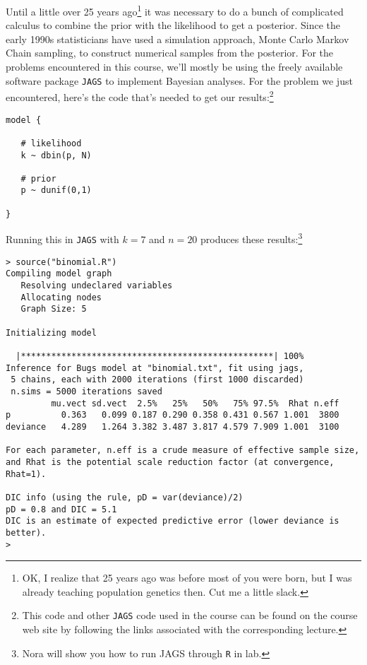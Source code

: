 \documentclass[12pt]{article}
\begin{document}
Until a little over 25 years ago\footnote{OK, I realize that 25 years
  ago was before most of you were born, but I was already teaching
  population genetics then. Cut me a little slack.} it was necessary
to do a bunch of complicated calculus to combine the prior with the
likelihood to get a posterior. Since the early 1990s statisticians
have used a simulation approach, Monte Carlo Markov Chain sampling, to
construct numerical samples from the posterior. For the problems
encountered in this course, we'll mostly be using the freely available
software package {\tt JAGS} to implement Bayesian analyses. For the
problem we just encountered, here's the code that's needed to get our
results:\footnote{This code and other {\tt JAGS} code used in the
  course can be found on the course web site by following the links
  associated with the corresponding
  lecture.}
\begin{verbatim}
model {

   # likelihood
   k ~ dbin(p, N)

   # prior
   p ~ dunif(0,1)

}
\end{verbatim}
Running this in {\tt JAGS} with $k=7$ and $n=20$ produces these
results:\footnote{Nora will show you how to run JAGS through {\tt R}
  in lab.}
\begin{verbatim}
> source("binomial.R")
Compiling model graph
   Resolving undeclared variables
   Allocating nodes
   Graph Size: 5

Initializing model

  |**************************************************| 100%
Inference for Bugs model at "binomial.txt", fit using jags,
 5 chains, each with 2000 iterations (first 1000 discarded)
 n.sims = 5000 iterations saved
         mu.vect sd.vect  2.5%   25%   50%   75% 97.5%  Rhat n.eff
p          0.363   0.099 0.187 0.290 0.358 0.431 0.567 1.001  3800
deviance   4.289   1.264 3.382 3.487 3.817 4.579 7.909 1.001  3100

For each parameter, n.eff is a crude measure of effective sample size,
and Rhat is the potential scale reduction factor (at convergence, Rhat=1).

DIC info (using the rule, pD = var(deviance)/2)
pD = 0.8 and DIC = 5.1
DIC is an estimate of expected predictive error (lower deviance is better).
>
\end{verbatim}
\end{document}
